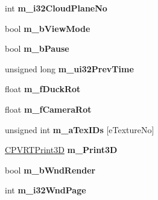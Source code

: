 \begin{DoxyCompactItemize}
\item 
\hypertarget{class_o_g_l_e_s_fur_a209850408b763fa890adb8aeb37e75dc}{int {\bfseries m\+\_\+i32\+Cloud\+Plane\+No}}\label{class_o_g_l_e_s_fur_a209850408b763fa890adb8aeb37e75dc}

\item 
\hypertarget{class_o_g_l_e_s_fur_a78e49a353e0658dfb3af72169530a4a1}{bool {\bfseries m\+\_\+b\+View\+Mode}}\label{class_o_g_l_e_s_fur_a78e49a353e0658dfb3af72169530a4a1}

\item 
\hypertarget{class_o_g_l_e_s_fur_a27f3e6e760ee70b16afecb31a0fc4713}{bool {\bfseries m\+\_\+b\+Pause}}\label{class_o_g_l_e_s_fur_a27f3e6e760ee70b16afecb31a0fc4713}

\item 
\hypertarget{class_o_g_l_e_s_fur_a561a6c71c16377008befe6ed2d8718b0}{unsigned long {\bfseries m\+\_\+ui32\+Prev\+Time}}\label{class_o_g_l_e_s_fur_a561a6c71c16377008befe6ed2d8718b0}

\item 
\hypertarget{class_o_g_l_e_s_fur_a7355304df809626dd8f6c2d38784883e}{float {\bfseries m\+\_\+f\+Duck\+Rot}}\label{class_o_g_l_e_s_fur_a7355304df809626dd8f6c2d38784883e}

\item 
\hypertarget{class_o_g_l_e_s_fur_a7f6230d5f405760395c98514e0a8a24f}{float {\bfseries m\+\_\+f\+Camera\+Rot}}\label{class_o_g_l_e_s_fur_a7f6230d5f405760395c98514e0a8a24f}

\item 
\hypertarget{class_o_g_l_e_s_fur_adf962414ac798591d4d82bf960c9c4af}{unsigned int {\bfseries m\+\_\+a\+Tex\+I\+Ds} \mbox{[}e\+Texture\+No\mbox{]}}\label{class_o_g_l_e_s_fur_adf962414ac798591d4d82bf960c9c4af}

\item 
\hypertarget{class_o_g_l_e_s_fur_a996772c1aff4d1b362b937ff2616aaf0}{\hyperlink{class_c_p_v_r_t_print3_d}{C\+P\+V\+R\+T\+Print3\+D} {\bfseries m\+\_\+\+Print3\+D}}\label{class_o_g_l_e_s_fur_a996772c1aff4d1b362b937ff2616aaf0}

\item 
\hypertarget{class_o_g_l_e_s_fur_a81aa5bc05de5e2192cf15d280d52f0e1}{bool {\bfseries m\+\_\+b\+Wnd\+Render}}\label{class_o_g_l_e_s_fur_a81aa5bc05de5e2192cf15d280d52f0e1}

\item 
\hypertarget{class_o_g_l_e_s_fur_a2659d1d8f03f377741c2a585b2aabe96}{int {\bfseries m\+\_\+i32\+Wnd\+Page}}\label{class_o_g_l_e_s_fur_a2659d1d8f03f377741c2a585b2aabe96}


\end{DoxyCompactItemize}
